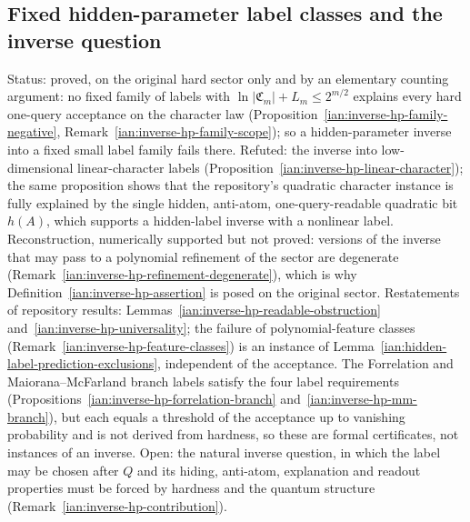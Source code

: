 \subsection{Fixed hidden-parameter label classes and the inverse question}
\label{ian:inverse-hidden-parameter}
Status: proved, on the original hard sector only and by an elementary counting argument: no fixed family of labels with \(\ln|\mathfrak C_m|+L_m\le2^{m/2}\) explains every hard one-query acceptance on the character law (Proposition~\ref{ian:inverse-hp-family-negative}, Remark~\ref{ian:inverse-hp-family-scope}); so a hidden-parameter inverse into a fixed small label family fails there. Refuted: the inverse into low-dimensional linear-character labels (Proposition~\ref{ian:inverse-hp-linear-character}); the same proposition shows that the repository's quadratic character instance is fully explained by the single hidden, anti-atom, one-query-readable quadratic bit \(h(A)\), which supports a hidden-label inverse with a nonlinear label. Reconstruction, numerically supported but not proved: versions of the inverse that may pass to a polynomial refinement of the sector are degenerate (Remark~\ref{ian:inverse-hp-refinement-degenerate}), which is why Definition~\ref{ian:inverse-hp-assertion} is posed on the original sector. Restatements of repository results: Lemmas~\ref{ian:inverse-hp-readable-obstruction} and~\ref{ian:inverse-hp-universality}; the failure of polynomial-feature classes (Remark~\ref{ian:inverse-hp-feature-classes}) is an instance of Lemma~\ref{ian:hidden-label-prediction-exclusions}, independent of the acceptance. The Forrelation and Maiorana--McFarland branch labels satisfy the four label requirements (Propositions~\ref{ian:inverse-hp-forrelation-branch} and~\ref{ian:inverse-hp-mm-branch}), but each equals a threshold of the acceptance up to vanishing probability and is not derived from hardness, so these are formal certificates, not instances of an inverse. Open: the natural inverse question, in which the label may be chosen after \(Q\) and its hiding, anti-atom, explanation and readout properties must be forced by hardness and the quantum structure (Remark~\ref{ian:inverse-hp-contribution}).

